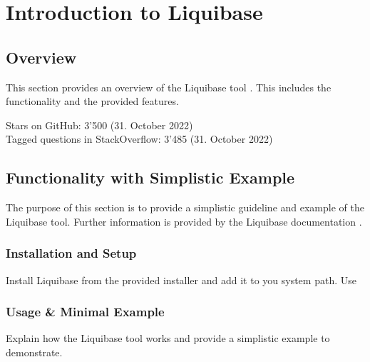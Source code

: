 

\chapter{Introduction to Liquibase}
\section{Overview}
This section provides an overview of the Liquibase tool \cite{LiquibaseDoc}. This includes the functionality and the provided features.

%
%
%
%
Stars on GitHub: 3'500 (31. October 2022)\\
Tagged questions in StackOverflow: 3'485 (31. October 2022)\\

\section{Functionality with Simplistic Example}
The purpose of this section is to provide a simplistic guideline and example of the Liquibase tool. Further information is provided by the Liquibase documentation \cite{LiquibaseDoc}.

\subsection{Installation and Setup}
%
Install Liquibase from the provided installer and add it to you system path. 
Use \


\subsection{Usage \&  Minimal Example}


Explain how the Liquibase tool works and provide a simplistic example to demonstrate.







\newpage